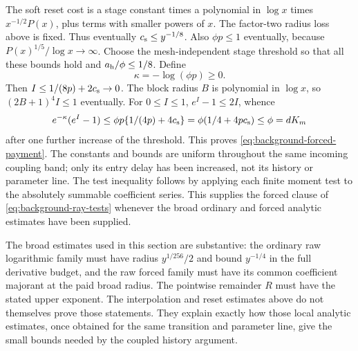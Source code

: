 The soft reset cost is a stage constant times a polynomial in
$\log x$ times $x^{-1/2}P(x)$, plus terms with smaller powers of $x$.
The factor-two radius loss above is fixed. Thus eventually
$c_{\rm s}\le y^{-1/8}$. Also $\phi p\le1$ eventually, because
$P(x)^{1/5}/\log x\to\infty$.
Choose the mesh-independent stage threshold so that all these bounds
hold and $a_{\rm h}/\phi\le1/8$. Define
\[
 \kappa=-\log(\phi p)\ge0.
\]
Then $I\le1/(8p)+2c_{\rm s}\to0$. The block radius $B$ is
polynomial in $\log x$, so $(2B+1)^4I\le1$ eventually.
For $0\le I\le1$, $e^I-1\le2I$, whence
\[
 e^{-\kappa}(e^I-1)
 \le\phi p\{1/(4p)+4c_{\rm s}\}
 =\phi(1/4+4pc_{\rm s})\le\phi=dK_m
\]
after one further increase of the threshold. This proves
\eqref{eq:background-forced-payment}. The constants and bounds are
uniform throughout the same incoming coupling band; only its entry
delay has been increased, not its history or parameter line.
The test inequality follows by applying each finite moment test
to the absolutely summable coefficient series. This supplies the
forced clause of \eqref{eq:background-ray-tests} whenever the
broad ordinary and forced analytic estimates have been supplied.

The broad estimates used in this section are substantive: the
ordinary raw logarithmic family must have radius $y^{1/256}/2$
and bound $y^{-1/4}$ in the full derivative budget, and the raw
forced family must have its common coefficient majorant at the
paid broad radius. The pointwise remainder $R$ must have the
stated upper exponent. The interpolation and reset estimates
above do not themselves prove those statements. They explain
exactly how those local analytic estimates, once obtained for
the same transition and parameter line, give the small bounds
needed by the coupled history argument.
